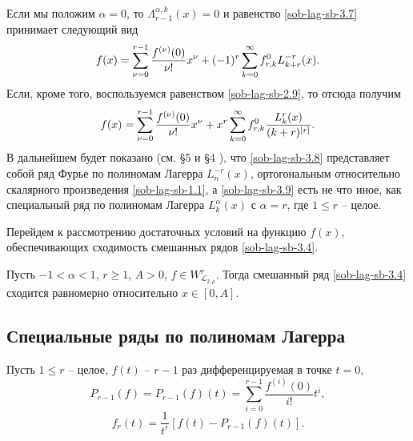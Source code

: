 Если  мы положим $\alpha=0$, то $\Lambda_{r-1}^{\alpha,k}(x)=0$ и равенство \eqref{sob-lag-sb-3.7} принимает следующий вид
\begin{equation}\label{sob-lag-sb-3.8}
  f(x)=\sum_{\nu=0}^{r-1}  {f^{(\nu)}(0)\over \nu!}x^\nu +(-1)^r\sum_{k=0}^\infty f_{r,k}^0
L_{k+r}^{-r}(x).
 \end{equation}
Если, кроме того, воспользуемся равенством \eqref{sob-lag-sb-2.9}, то отсюда получим
\begin{equation}\label{sob-lag-sb-3.9}
  f(x)=\sum_{\nu=0}^{r-1}  {f^{(\nu)}(0)\over \nu!}x^\nu +x^r\sum_{k=0}^\infty f_{r,k}^0
{L_{k}^{r}(x)\over (k+r)^{[r]}}.
 \end{equation}
В дальнейшем будет показано (см. \S5 и \S 4 ), что  \eqref{sob-lag-sb-3.8} представляет собой  ряд Фурье по полиномам Лагерра $L_{n}^{-r}(x)$, ортогональным относительно скалярного произведения \eqref{sob-lag-sb-1.1}, а \eqref{sob-lag-sb-3.9} есть не что иное, как  специальный ряд по полиномам Лагерра
$L_{k}^{\alpha}(x)$ с $\alpha=r$, где $1\le r$ -- целое.

     Перейдем к рассмотрению достаточных условий на функцию $f(x)$,
     обеспечивающих сходимость смешанных рядов  \eqref{sob-lag-sb-3.4}.
 \begin{theorem}
      Пусть $-1<\alpha<1$, $r\ge1$,
     $A>0$, $f\in W^r_{\mathcal{L}_{2,\rho}}$. Тогда смешанный ряд
    \eqref{sob-lag-sb-3.4}  сходится равномерно относительно $x\in[0,A]$.
\end{theorem}










\subsection{Специальные ряды по полиномам Лагерра}

Пусть $1\le r$ -- целое, $f(t)$ -- $r-1$ раз дифференцируемая в точке $t=0$,
\begin{equation}\label{sob-lag-sb-4.1}
  P_{r-1}(f)=P_{r-1}(f)(t)=\sum\limits_{i=0}^{r-1}\frac{f^{(i)}(0)}{i!}t^i,
\end{equation}
\begin{equation}\label{sob-lag-sb-4.2}
  f_r(t)=\frac1{t^r}[f(t)-P_{r-1}(f)(t)].
\end{equation}

